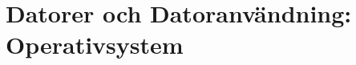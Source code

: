 \documentclass{lecturenotes}
\renewcommand{\vecka}{1}
\begin{document}
\frame{\titlepage}
\setnextsection{\vecka}
\section[Vecka \vecka: Introduktion]{Datorer och Datoranvändning: Operativsystem}
\frame{\tableofcontents}


\end{document}
